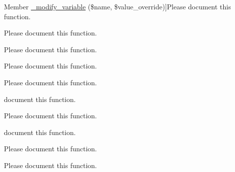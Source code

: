 \begin{DoxyRefList}
\hypertarget{todo__todo000004}{}%
Member \hyperlink{cdm__dataportal_8install_a5b56096b8a84ac6ee2eaa0f5407ba139}{\-\_\-modify\-\_\-variable} (\$name, \$value\-\_\-override)]Please document this function.  
\item[\label{todo__todo000083}%
\hypertarget{todo__todo000083}{}%
Member \hyperlink{cdm__api_8module_a13e1ba2fc96143e8f72e393653af882d}{\-\_\-no\-\_\-classfication\-\_\-uuid\-\_\-message} ()]Please document this function.  
\item[\label{todo__todo000002}%
\hypertarget{todo__todo000002}{}%
Member \hyperlink{cdm__dataportal_8install_a22173427ed5108fdfb0e9858f9553cef}{\-\_\-remove\-\_\-variable} (\$name)]Please document this function.  
\item[\label{todo__todo000001}%
\hypertarget{todo__todo000001}{}%
Member \hyperlink{cdm__dataportal_8install_a1d36393283fadcbbdc7d7837efcfa43c}{\-\_\-rename\-\_\-variable} (\$old\-\_\-name, \$new\-\_\-name)]Please document this function.  
\item[\label{todo__todo000193}%
\hypertarget{todo__todo000193}{}%
Member \hyperlink{cdm__dataportal_8references_8theme_ab25a33a878685df7e8c37f7c5d967681}{\-\_\-short\-\_\-form\-\_\-of\-\_\-author\-\_\-team} (\$author\-\_\-team)]Please document this function.  
\item[\label{todo__todo000118}%
\hypertarget{todo__todo000118}{}%
Member \hyperlink{fsi__gallery_8module_afbe781b4045905b65432e9900e1c212a}{\-\_\-showcase\-\_\-query\-\_\-name} (\$taxon)]document this function.  
\item[\label{todo__todo000132}%
\hypertarget{todo__todo000132}{}%
Member \hyperlink{cdm__dataportal_8common_8theme_a25169077ae083be565d58fdd3c147753}{cdm\-\_\-add\-\_\-footnote\-\_\-to\-\_\-array} (\&\$footnote\-\_\-list, \$footnote)]Please document this function.  
\item[\label{todo__todo000085}%
\hypertarget{todo__todo000085}{}%
Member \hyperlink{cdm__node_8php_af818d37c69b2409883a0ea8287e2fa21}{cdm\-\_\-add\-\_\-node\-\_\-content} (\&\$node, \$content)]document this function.  
\item[\label{todo__todo000177}%
\hypertarget{todo__todo000177}{}%
Member \hyperlink{cdm__dataportal_8name_8theme_a51efa3b24584097d57c872c5944fc5eb}{cdm\-\_\-add\-\_\-type\-\_\-designations} (\$source, \$extra)]Please document this function.  
\item[\label{todo__todo000028}%
\hypertarget{todo__todo000028}{}%
Member \hyperlink{cdm__dataportal_8module_a9f46336913dc5a5dd7914d66ed840f40}{cdm\-\_\-annotations\-\_\-as\-\_\-footnotekeys} (\$cdm\-Base\-\_\-list, \$footnote\-\_\-list\-\_\-key=N\-U\-L\-L)]Please document this function.  

\end{DoxyRefList}
